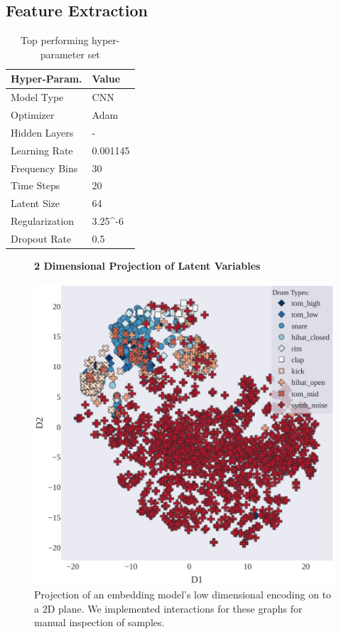 \documentclass[\main/thesis.tex]{subfiles}
\begin{document}
\subsection{Feature Extraction}
\label{fig:embedding_FE}
\begin{table}[htbp!]
\centering
\begin{tabular}{|p{6cm}|p{6cm}|}
\hline
Hyper-Param. & Value  \\ \hline
Model Type      &  CNN  \\ \hline
Optimizer       & Adam  \\ \hline
Hidden Layers   & -  \\\hline
Learning Rate   &  0.001145\\ \hline
Frequency Bins & 30 \\ \hline
Time Steps & 20 \\ \hline
Latent Size & 64 \\ \hline
Regularization & 3.25^{-6}\\ \hline
Dropout Rate & 0.5 \\ \hline
\end{tabular}
\caption{Top performing hyper-parameter set}
\label{table:best_params}
\end{table}
\begin{figure}[h!]
\centering
\textbf{2 Dimensional Projection of Latent Variables}\par\medskip
 \includegraphics[width=0.90\linewidth]{images/chapter_3/t-SNE_2d.pdf}
\caption{Projection of an embedding model's low dimensional encoding on to a 2D plane. We implemented interactions for these graphs for manual inspection of samples.}
\label{fig:2d_tsne}
\end{figure}
\end{document}
